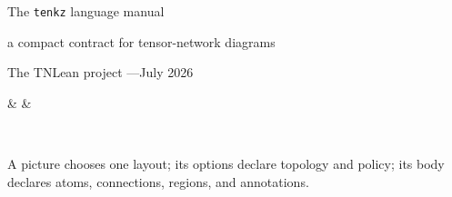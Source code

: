 \documentclass[11pt]{article}
\newcommand\pkg{\texttt{tenkz}}
\begin{document}
\thispagestyle{empty}
\begin{fullwidth}
  \centering
  \vspace*{16mm}
  {\Huge The \pkg{} language manual\par}
  \vspace{3mm}
  {\Large a compact contract for tensor-network diagrams\par}
  \vspace{4mm}
  {The TNLean project \quad---\quad July 2026\par}
  \vspace{16mm}

  \begin{tenkz}[cols=3]
     &
     &
  \end{tenkz}
  \hspace{13mm}
  \begin{tenkz}[rows={ket,bra}, cols=1, west=open, east={cup=$X$}]
     \\
  \end{tenkz}

  \vspace{16mm}
  \begin{minipage}{0.78\mfullwidth}
    \large
    A picture chooses one layout; its options declare topology and
    policy; its body declares atoms, connections, regions, and
    annotations.
  \end{minipage}
\end{fullwidth}

\clearpage
\setcounter{tocdepth}{1}
\tableofcontents










\appendix

\end{document}
